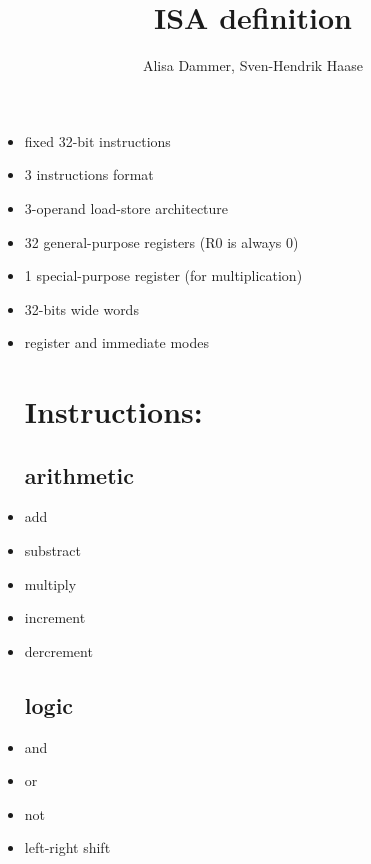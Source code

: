 \documentclass[10pt]{article}
\author{Alisa Dammer, Sven-Hendrik Haase}
\title{ISA definition}
\begin{document}
\maketitle
\begin{itemize}
\section{General information:}
\item fixed 32-bit instructions \\
\item 3 instructions format \\
\item 3-operand load-store architecture \\
\item 32 general-purpose registers (R0 is always 0) \\
\item 1 special-purpose register (for multiplication) \\
\item 32-bits wide words \\
\item register and immediate modes\\

\section{Instructions:}
\subsection{arithmetic}
\item add \\
\item substract \\
\item multiply \\
\item increment \\
\item dercrement
\subsection{logic}
\item and \\
\item or \\
\item not \\
\item left-right shift

\end{itemize}
\end{document}
